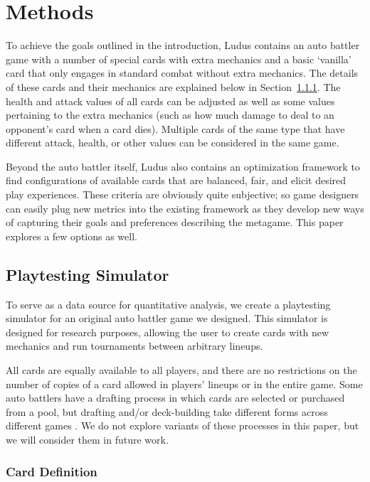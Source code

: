 \documentclass[letterpaper]{article} %
\begin{document}
\section{Methods} \label{sec:methods}
To achieve the goals outlined in the introduction, {\sc Ludus} contains an auto battler game with a number of special cards with extra mechanics and a basic `vanilla' card that only engages in standard combat without extra mechanics. The details of these cards and their mechanics are explained below in Section~\ref{sec:ab-game-def}. The health and attack values of all cards can be adjusted as well as some values pertaining to the extra mechanics (such as how much damage to deal to an opponent's card when a card dies). Multiple cards of the same type that have different attack, health, or other values can be considered in the same game. 

Beyond the auto battler itself, {\sc Ludus} also contains an optimization framework to find configurations of available cards that are balanced, fair, and elicit desired play experiences. These criteria are obviously quite subjective; so game designers can easily plug new metrics into the existing framework as they develop new ways of capturing their goals and preferences describing the metagame. This paper explores a few options as well.

\subsection{Playtesting Simulator} \label{sec:sim}

To serve as a data source for quantitative analysis, we create
a playtesting simulator for an original auto battler game we designed. 
This simulator is designed for research purposes, allowing the user to 
create cards with new mechanics and run tournaments between
arbitrary lineups. 

All cards are equally available to all players, and there are no restrictions on the number of copies of a card allowed in players' lineups or in the entire game. Some auto battlers have a drafting process in which cards are selected or purchased from a pool, but drafting and/or deck-building take different forms across different games \cite{hearthstone-battlegrounds,storybook-brawl,feh-pawnsOfLoki-video}. We do not explore variants of these processes in this paper, but we will consider them in future work.

\subsubsection{Card Definition} \label{sec:ab-game-def}
\end{document}
